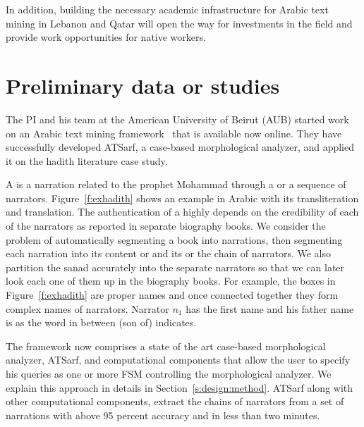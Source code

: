 \documentclass[12pt]{article}
\newcommand{\noArRL}[1]{\arabfalse\RL{#1}\arabtrue}
\newcommand{\noTrRL}[1]{\transfalse\RL{#1}\transtrue}
\begin{document}
{In addition, building the necessary academic 
infrastructure for Arabic text mining in Lebanon and Qatar will 
open the way for investments in the field and provide work 
opportunities for native workers.

\pagebreak

\section{Preliminary data or studies}
\label{s:prelim}

The PI and his team at the American University of Beirut (AUB)
started work on an Arabic text mining framework~\cite{ATMine09}
that is available now online.
They have successfully developed ATSarf, a case-based morphological 
analyzer, and applied it on the hadith literature case study. 

A  is a narration related to the prophet Mohammad
through a  or a sequence of narrators. 
Figure~\ref{f:exhadith} shows an example \noArRL{.hady_t} in Arabic with its 
transliteration and translation. 
The authentication of a \noArRL{.hady_t} highly depends on the credibility
of each of the narrators as reported in separate biography 
books. 
We consider the problem of automatically segmenting
a \noArRL{.hady_t} book into narrations, then segmenting each 
narration into
its content or  and its \noArRL{sanad} or the
chain of narrators.
We also partition the sanad accurately into the 
separate narrators so that we can later look each one of them 
up in the biography books. 
For example, the boxes in Figure~\ref{f:exhadith} are proper names 
and once
connected together they form complex names of narrators. 
Narrator $n_1$ has the first name \noTrRL{qtybT} and his father 
name is \noTrRL{s`yd} as the word in between 
\noTrRL{bn} (son of) indicates. 

\transfalse
\begin{figure}[tb]
\end{figure}
\transtrue

The framework now comprises a state of the art
case-based morphological analyzer, ATSarf, 
and computational components that allow the user to
specify his queries as one or more FSM
controlling the morphological analyzer.
We explain this approach in details in 
Section~\ref{s:design:method}.
ATSarf along with other computational components, 
extract the chains of narrators from a set of narrations
with above 95 percent accuracy and in less than two minutes. 

}
\end{document}
